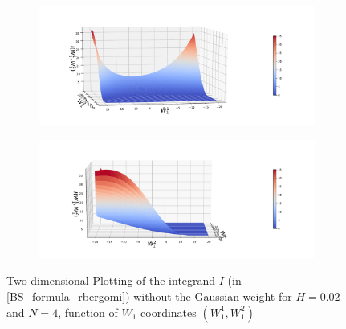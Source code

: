 \documentclass[11pt]{article}
\begin{document}
\begin{figure}[h!]
	\centering
	\begin{subfigure}{.4\textwidth}
		\centering
		\includegraphics[width=1\linewidth]{./figures/integrand_plotting_rBergomi/2D_plots/N_4/integrand_without_density/H_002/Bergomi_integrand_contours_K_1_H_002_W1_1_2_N_4_without_weights_2_80}
		\caption{}
		\label{fig:sub3}
	\end{subfigure}%
	\begin{subfigure}{.4\textwidth}
		\centering
		\includegraphics[width=1\linewidth]{./figures/integrand_plotting_rBergomi/2D_plots/N_4/integrand_without_density/H_002/Bergomi_integrand_contours_K_1_H_002_W1_1_2_N_4_without_weights_2_0}
		\caption{}
		\label{fig:sub4}
	\end{subfigure}
	
	
	
	\caption{Two dimensional Plotting of the integrand $I$ (in \eqref{BS_formula_rbergomi}) without the Gaussian weight  for $H=0.02$ and $N=4$, function of $W_1$ coordinates $(W_1^1,W^2_1)$}
	\label{fig:Two dimensional Plotting of the integrand $I$_W12_view_set15}
\end{figure}

\FloatBarrier
\newpage

 
\end{document}

